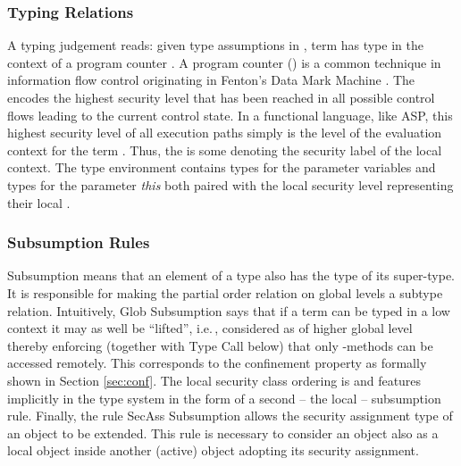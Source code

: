 \documentclass[10pt, conference, compsocconf]{IEEEtran}
\newcommand\aspfunp{ASP}
\newcommand\ie{i.e.\!\,, }
\begin{document}
{\subsubsection*{Typing Relations}
A typing judgement  reads: 
given type assumptions in , term  has type 
in the context of a program counter . 
A program counter () is a common technique in information flow control 
originating in Fenton's Data Mark Machine \cite{fen:73}. The  encodes the highest security level that has been reached in all possible control flows leading 
to the current control state. In a functional language, like \aspfunp, this highest security level of all execution paths simply is the level of the evaluation context 
for the term .
Thus, the  is some  denoting the security label of the local context. 
The type environment  contains types  for the parameter variables
 and types for the parameter {\it this} both paired with the local security 
level  representing their local .


\subsubsection*{Subsumption Rules}
Subsumption means that an element of a type also has the type of its super-type. 
It is responsible for making the partial order relation on global levels a subtype relation. 
Intuitively, {\sc Glob Subsumption} says that if a term can be typed in a low context
it may as well be ``lifted'', \ie considered as of higher global level thereby enforcing 
(together with {\sc Type Call} below) that only -methods can be accessed remotely.
This corresponds to the confinement property as formally shown in Section \ref{sec:conf}.
The local security class ordering is  and features implicitly in the type 
system in the form of a second -- the local -- subsumption rule.
Finally, the rule {\sc SecAss Subsumption} allows the security assignment type of an object
to be extended. This rule is necessary to consider an object also as a local object
inside another (active) object adopting its security assignment.
\begin{table}[!h]
\vspace{-3ex}
\begin{mathpar}



\end{mathpar}
\end{table}}
\end{document}
